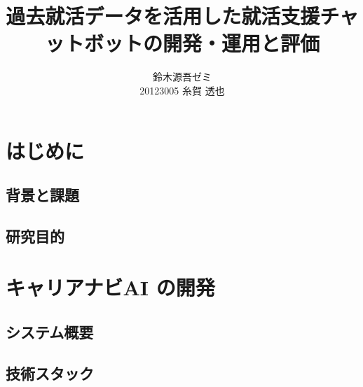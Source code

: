 \documentclass[a4paper]{jsarticle}
\title{過去就活データを活用した就活支援チャットボットの開発・運用と評価}
\author{鈴木源吾ゼミ \\ 20123005 糸賀 透也}
\date{}
\begin{document}
\maketitle

\tableofcontents
\newpage

\section{はじめに}
\label{sec:intro}

\subsection{背景と課題}
\label{sec:background}

\subsection{研究目的}
\label{sec:purpose}

\section{キャリアナビAI の開発}
\label{sec:development}

\subsection{システム概要}
\label{sec:overview}

\subsection{技術スタック}
\label{sec:techstack}
\end{document}
